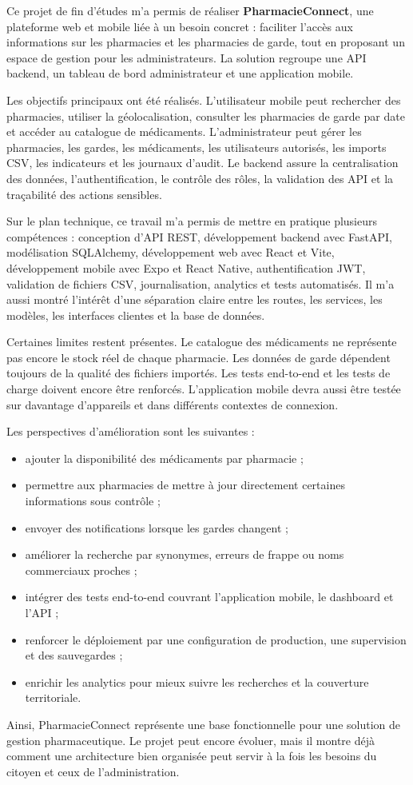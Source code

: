 Ce projet de fin d'études m'a permis de réaliser \textbf{PharmacieConnect}, une plateforme web et mobile
liée à un besoin concret : faciliter l'accès aux informations sur les pharmacies et les pharmacies de garde,
tout en proposant un espace de gestion pour les administrateurs. La solution regroupe une API backend,
un tableau de bord administrateur et une application mobile.

Les objectifs principaux ont été réalisés. L'utilisateur mobile peut rechercher des pharmacies, utiliser la
géolocalisation, consulter les pharmacies de garde par date et accéder au catalogue de médicaments.
L'administrateur peut gérer les pharmacies, les gardes, les médicaments, les utilisateurs autorisés, les
imports CSV, les indicateurs et les journaux d'audit. Le backend assure la centralisation des données,
l'authentification, le contrôle des rôles, la validation des API et la traçabilité des actions sensibles.

Sur le plan technique, ce travail m'a permis de mettre en pratique plusieurs compétences : conception
d'API REST, développement backend avec FastAPI, modélisation SQLAlchemy, développement web avec
React et Vite, développement mobile avec Expo et React Native, authentification JWT, validation de
fichiers CSV, journalisation, analytics et tests automatisés. Il m'a aussi montré l'intérêt d'une séparation
claire entre les routes, les services, les modèles, les interfaces clientes et la base de données.

Certaines limites restent présentes. Le catalogue des médicaments ne représente pas encore le stock réel
de chaque pharmacie. Les données de garde dépendent toujours de la qualité des fichiers importés. Les
tests end-to-end et les tests de charge doivent encore être renforcés. L'application mobile devra aussi
être testée sur davantage d'appareils et dans différents contextes de connexion.

Les perspectives d'amélioration sont les suivantes :

\begin{itemize}
    \item ajouter la disponibilité des médicaments par pharmacie ;
    \item permettre aux pharmacies de mettre à jour directement certaines informations sous contrôle ;
    \item envoyer des notifications lorsque les gardes changent ;
    \item améliorer la recherche par synonymes, erreurs de frappe ou noms commerciaux proches ;
    \item intégrer des tests end-to-end couvrant l'application mobile, le dashboard et l'API ;
    \item renforcer le déploiement par une configuration de production, une supervision et des sauvegardes ;
    \item enrichir les analytics pour mieux suivre les recherches et la couverture territoriale.
\end{itemize}

Ainsi, PharmacieConnect représente une base fonctionnelle pour une solution de gestion pharmaceutique.
Le projet peut encore évoluer, mais il montre déjà comment une architecture bien organisée peut servir à
la fois les besoins du citoyen et ceux de l'administration.
